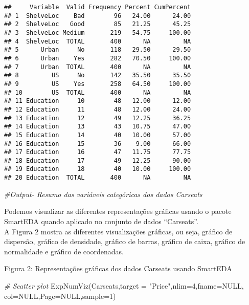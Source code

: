 \documentclass[
]{article}
\newenvironment{Shaded}{\begin{snugshade}}{\end{snugshade}}
\newcommand{\AttributeTok}[1]{\textcolor[rgb]{0.77,0.63,0.00}{#1}}
\newcommand{\CommentTok}[1]{\textcolor[rgb]{0.56,0.35,0.01}{\textit{#1}}}
\newcommand{\ConstantTok}[1]{\textcolor[rgb]{0.00,0.00,0.00}{#1}}
\newcommand{\DecValTok}[1]{\textcolor[rgb]{0.00,0.00,0.81}{#1}}
\newcommand{\FunctionTok}[1]{\textcolor[rgb]{0.00,0.00,0.00}{#1}}
\newcommand{\NormalTok}[1]{#1}
\newcommand{\StringTok}[1]{\textcolor[rgb]{0.31,0.60,0.02}{#1}}
\begin{document}
\begin{verbatim}
##     Variable  Valid Frequency Percent CumPercent
## 1  ShelveLoc    Bad        96   24.00      24.00
## 2  ShelveLoc   Good        85   21.25      45.25
## 3  ShelveLoc Medium       219   54.75     100.00
## 4  ShelveLoc  TOTAL       400      NA         NA
## 5      Urban     No       118   29.50      29.50
## 6      Urban    Yes       282   70.50     100.00
## 7      Urban  TOTAL       400      NA         NA
## 8         US     No       142   35.50      35.50
## 9         US    Yes       258   64.50     100.00
## 10        US  TOTAL       400      NA         NA
## 11 Education     10        48   12.00      12.00
## 12 Education     11        48   12.00      24.00
## 13 Education     12        49   12.25      36.25
## 14 Education     13        43   10.75      47.00
## 15 Education     14        40   10.00      57.00
## 16 Education     15        36    9.00      66.00
## 17 Education     16        47   11.75      77.75
## 18 Education     17        49   12.25      90.00
## 19 Education     18        40   10.00     100.00
## 20 Education  TOTAL       400      NA         NA
\end{verbatim}

\begin{Shaded}
\begin{Highlighting}[]
\CommentTok{\#Output{-} Resumo das variáveis categóricas dos dados Carseats}
\end{Highlighting}
\end{Shaded}

Podemos visualizar as diferentes representações gráficas usando o pacote
SmartEDA quando aplicado no conjunto de dados ``Carseats''.\\
A Figura 2 mostra as diferentes visualizações gráficas, ou seja, gráfico
de dispersão, gráfico de densidade, gráfico de barras, gráfico de caixa,
gráfico de normalidade e gráfico de coordenadas.

Figura 2: Representações gráficas dos dados Carseats usando SmartEDA

\begin{Shaded}
\begin{Highlighting}[]
\CommentTok{\# Scatter plot}
\FunctionTok{ExpNumViz}\NormalTok{(Carseats,}\AttributeTok{target =} \StringTok{"Price"}\NormalTok{,}\AttributeTok{nlim=}\DecValTok{4}\NormalTok{,}\AttributeTok{fname=}\ConstantTok{NULL}\NormalTok{, }\AttributeTok{col=}\ConstantTok{NULL}\NormalTok{,}\AttributeTok{Page=}\ConstantTok{NULL}\NormalTok{,}\AttributeTok{sample=}\DecValTok{1}\NormalTok{)}
\end{Highlighting}
\end{Shaded}
\end{document}
